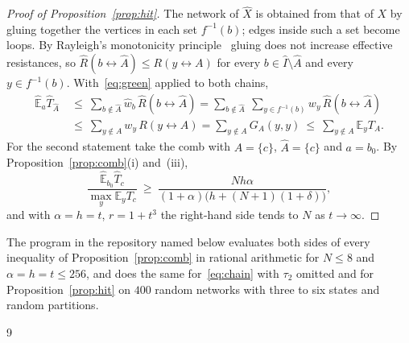 \documentclass[11pt]{amsart}
\theoremstyle{definition}
\newcommand{\E}{\mathbb{E}}
\newcommand{\hE}{\widehat{\E}}
\newcommand{\hw}{\widehat{w}}
\newcommand{\hI}{\widehat{I}}
\newcommand{\hA}{\widehat{A}}
\newcommand{\hX}{\widehat{X}}
\newcommand{\lra}{\leftrightarrow}
\begin{document}
\begin{proof}[Proof of Proposition~\ref{prop:hit}]
The network of $\hX$ is obtained from that of $X$ by gluing together the vertices in each set $f^{-1}(b)$; edges
inside such a set become loops. By Rayleigh's monotonicity principle~\cite[Section~2.4]{LP} gluing does not increase
effective resistances, so $\widehat{R}(b\lra\hA)\le R(y\lra A)$ for every $b\in\hI\setminus\hA$ and every
$y\in f^{-1}(b)$. With~\eqref{eq:green} applied to both chains,
\begin{align*}
\hE_a\widehat{T}_{\hA}\ &\le\ \sum_{b\notin\hA}\hw_b\,\widehat{R}(b\lra\hA)
=\sum_{b\notin\hA}\ \sum_{y\in f^{-1}(b)}w_y\,\widehat{R}(b\lra\hA)\\
&\le\ \sum_{y\notin A}w_y\,R(y\lra A)=\sum_{y\notin A}G_A(y,y)\ \le\ \sum_{y\notin A}\E_yT_A .
\end{align*}
For the second statement take the comb with $A=\{c\}$, $\hA=\{c\}$ and $a=b_0$. By
Proposition~\ref{prop:comb}(i) and~(iii),
\[
\frac{\hE_{b_0}\widehat{T}_c}{\max_y\E_yT_c}\ \ge\ \frac{Nh\alpha}{(1+\alpha)\bigl(h+(N+1)(1+\delta)\bigr)},
\]
and with $\alpha=h=t$, $r=1+t^3$ the right-hand side tends to $N$ as $t\to\infty$.
\end{proof}

The program in the repository named below evaluates both sides of every inequality of Proposition~\ref{prop:comb} in
rational arithmetic for $N\le8$ and $\alpha=h=t\le256$, and does the same for~\eqref{eq:chain} with $\tau_2$ omitted
and for Proposition~\ref{prop:hit} on $400$ random networks with three to six states and random partitions.



\begin{thebibliography}{9}


\end{thebibliography}
\end{document}
